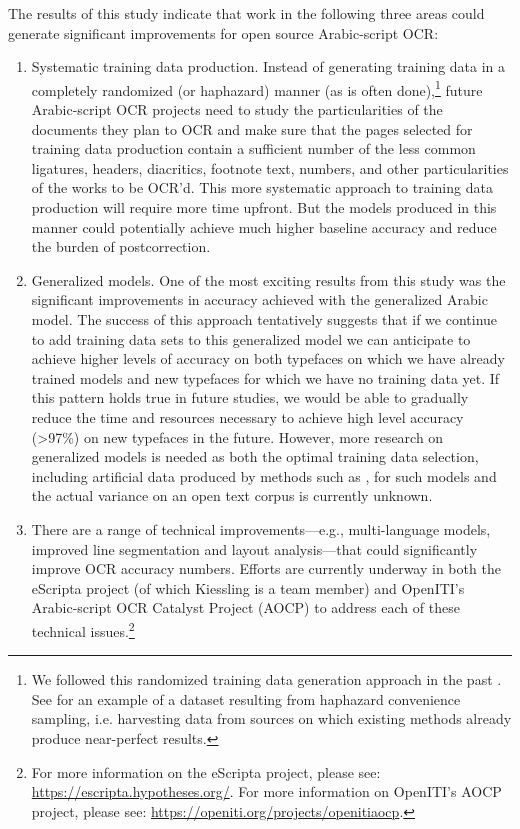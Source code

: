 The results of this study indicate that work in the following three areas could
generate significant improvements for open source Arabic-script OCR: 

\begin{enumerate}
\item Systematic training data production. Instead of generating training data
in a completely randomized (or haphazard) manner (as is often
done),\footnote{We followed this randomized training data generation approach
in the past \cite{kiessling2017important}. See \cite{springmann2018ground} for
an example of a dataset resulting from haphazard convenience sampling, i.e.
harvesting data from sources on which existing methods already produce
near-perfect results.} future Arabic-script OCR projects need to study the
particularities of the documents they plan to OCR and make sure that the pages
selected for training data production contain a sufficient number of the less
common ligatures, headers, diacritics, footnote text, numbers, and other
particularities of the works to be OCR’d. This more systematic approach to
training data production will require more time upfront. But the models
produced in this manner could potentially achieve much higher baseline accuracy
and reduce the burden of postcorrection. 
\item Generalized models. One of the most exciting results from this study was
the significant improvements in accuracy achieved with the generalized Arabic
model. The success of this approach tentatively suggests that if we continue to
add training data sets to this generalized model we can anticipate to achieve
higher levels of accuracy on both typefaces on which we have already trained
models and new typefaces for which we have no training data yet. If this
pattern holds true in future studies, we would be able to gradually reduce the
time and resources necessary to achieve high level accuracy (>97\%) on new
typefaces in the future. However, more research on generalized models is needed
as both the optimal training data selection, including artificial data produced
by methods such as \cite{milo2019new}, for such models and the actual
variance on an open text corpus is currently unknown.
\item There are a range of technical improvements—e.g., multi-language models,
improved line segmentation and layout analysis—that could significantly improve
OCR accuracy numbers. Efforts are currently underway in both the eScripta
project (of which Kiessling is a team member) and OpenITI’s Arabic-script OCR
Catalyst Project (AOCP) to address each of these technical issues.\footnote{For
more information on the eScripta project, please see:
\url{https://escripta.hypotheses.org/}. For more information on OpenITI’s AOCP
project, please see: \url{https://openiti.org/projects/openitiaocp}.}
\end{enumerate}

